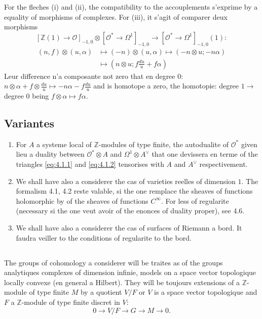 \documentclass[12pt,a4paper]{article}
\theoremstyle{plain}
\theoremstyle{definition}
\theoremstyle{remark}
\newcommand{\cO}{\mathcal{O}}
\newcommand{\Z}{\mathbb{Z}}
\providecommand{\cO}{\mathcal{O}}
\begin{document}
For the fleches (i) and (ii), the compatibility to the accouplements s'exprime by a equality
of morphisms of complexes. For (iii), it s'agit of comparer deux morphisms
\[
[\Z(1) \to \cO]_{-1,0} \otimes [\cO^* \to \Omega^1]_{-1,0} \to [\cO^* \to \Omega^1]_{-1,0}(1) :
\]
\begin{align*}
(n, f) \otimes (u, \alpha) &\longmapsto (-n) \otimes (u, \alpha) \longmapsto (-n \otimes u; -n\alpha) \\
&\longmapsto (n \otimes u; f \tfrac{du}{u} + f\alpha)
\end{align*}
Leur difference n'a composante not zero that en degree $0$: $n \otimes \alpha + f \otimes \tfrac{du}{u} \mapsto -n\alpha - f\tfrac{du}{u}$
and is homotope a zero, the homotopie: degree $1 \to$ degree $0$ being $f \otimes \alpha \mapsto f\alpha$.

\subsection{Variantes}

\begin{enumerate}[label=(\roman*)]
\item For $A$ a systeme local of $\Z$-modules of type finite, the autodualite
of $\cO^*$ given lieu a duality between $\cO^* \otimes A$ and $\Omega^1 \otimes A^\vee$ that one devissera en terme of the
triangles \eqref{eq:4.1.1} and \eqref{eq:4.1.2} tensorises with $A$ and $A^\vee$ respectivement.
\item We shall have also a considerer the cas of varieties reelles of dimension $1$. The
formalism 4.1, 4.2 reste valable, si the one remplace the sheaves of functions holomorphic
by of the sheaves of functions $C^\infty$. For less of regularite (necessary si the one veut
avoir of the enonces of duality proper), see 4.6.
\item We shall have also a considerer the cas of surfaces of Riemann a bord. It faudra
veiller to the conditions of regularite to the bord.
\end{enumerate}

\subsection{}

The groups of cohomology a considerer will be traites as of the groups
analytiques complexes of dimension infinie, models on a space vector topologique
locally convexe (en general a Hilbert). They will be toujours extensions of a $\Z$-module
of type finite $M$ by a quotient $V/F$ or $V$ is a space vector topologique and $F$ a
$\Z$-module of type finite discret in $V$:
\[
0 \to V/F \to G \to M \to 0.
\]
\end{document}
